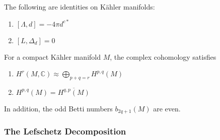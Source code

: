 \begin{thm}
	The following are identities on K\"ahler manifolds:
	\begin{enumerate}
		\item $\left[ \Lambda, d \right] = - 4 \pi d^{c*}$
		\item $ \left[ L, \Delta_d \right] = 0 $
	\end{enumerate}
\end{thm}

\begin{thm}
For a compact K\"ahler manifold $M$, the complex cohomology satisfies
\begin{enumerate}
	\item $H^r (M, \mathbb{C}) \approx \bigoplus_{p+q=r}H^{p,q}(M)$
	\item $H^{p,q}(M) = \overline{H^{q,p}(M)}$
\end{enumerate}
In addition, the odd Betti numbers $b_{2q+1}(M)$ are even.
\end{thm}

\subsubsection{The Lefschetz Decomposition}


























